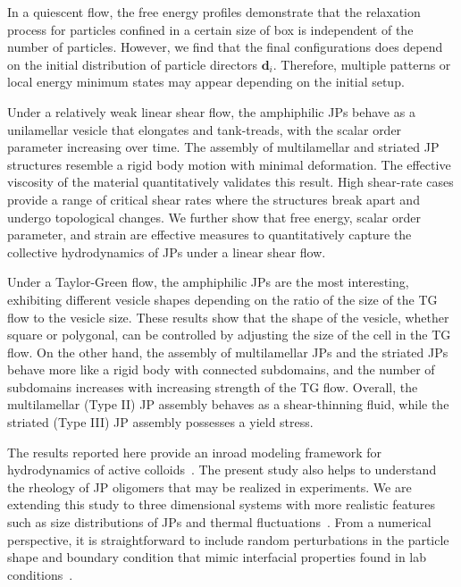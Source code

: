 \documentclass[prb,preprint,showpacs,preprintnumbers,amsmath,amssymb,longbibliography]{revtex4-2}
\newcommand{\dd}{\mathbf{d}}
\begin{document}
In a quiescent flow, the free energy profiles demonstrate that the
relaxation process for particles confined in a certain size of box is
independent of the number of particles. However, we find that the final
configurations does depend on the initial distribution of particle
directors $\dd_i$. Therefore, multiple patterns or local energy minimum
states may appear depending on the initial setup.

Under a relatively weak linear shear flow, the amphiphilic JPs behave as
a unilamellar vesicle that elongates and tank-treads, with the scalar
order parameter increasing over time. The assembly of multilamellar and
striated JP structures resemble a rigid body motion with minimal
deformation. The effective viscosity of the material quantitatively
validates this result. High shear-rate cases provide a range of critical
shear rates where the structures break apart and undergo topological
changes. We further show that free energy, scalar order parameter, and
strain are effective measures to quantitatively capture the collective
hydrodynamics of JPs under a linear shear flow.

Under a Taylor-Green flow, the amphiphilic JPs are the most interesting,
exhibiting different vesicle shapes depending on the ratio of the size
of the TG flow to the vesicle size. These results show that the shape of
the vesicle, whether square or polygonal, can be controlled by adjusting
the size of the cell in the TG flow. On the other hand, the assembly of
multilamellar JPs and the striated JPs behave more like a rigid body
with connected subdomains, and the number of subdomains increases with
increasing strength of the TG flow. Overall, the multilamellar (Type II)
JP assembly behaves as a shear-thinning fluid, while the striated (Type
III) JP assembly possesses a yield stress.

The results reported here provide an inroad modeling framework for
hydrodynamics of active colloids~\cite{Meredithetal2022,
McGlassonBradley2021, Vutukuri2020, Mallory2017}. The present study also
helps to understand the rheology of JP oligomers that may be realized in
experiments. We are extending this study to three dimensional systems
with more realistic features such as size distributions of JPs and
thermal fluctuations~\cite{kohl-cor-che-vee22}. From a numerical
perspective, it is straightforward to include random perturbations in
the particle shape and boundary condition that mimic interfacial
properties found in lab conditions~\cite{Bradley2016, Bradley2017,
Zarzaretal2015, doi:10.1021/la503455h}.
\end{document}
